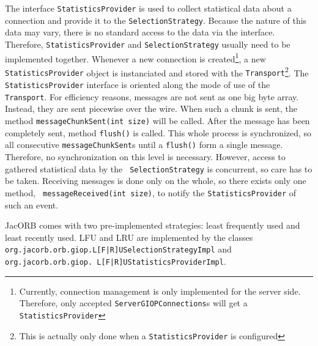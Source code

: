 The interface {\tt StatisticsProvider} is used to collect statistical data
about a connection and provide it to the {\tt SelectionStrategy}.  Because the
nature of this data may vary, there is no standard access to the data via the
interface. Therefore, {\tt StatisticsProvider} and {\tt SelectionStrategy}
usually need to be implemented together. Whenever a new connection is
created\footnote{Currently, connection management is only implemented for the
  server side. Therefore, only accepted {\tt ServerGIOPConnections}s will get
  a {\tt StatisticsProvider}}, a new {\tt StatisticsProvider} object is
instanciated and stored with the {\tt Transport}\footnote{This is actually
  only done when a {\tt StatisticsProvider} is configured}. The {\tt
  StatisticsProvider} interface is oriented along the mode of use of the {\tt
  Transport}. For efficiency reasons, messages are not sent as one big byte
array. Instead, they are sent piecewise over the wire. When such a chunk is
sent, the method {\tt messageChunkSent(int size)} will be called. After the
message has been completely sent, method {\tt flush()} is called. This whole
process is synchronized, so all consecutive {\tt messageChunkSent}s until a
{\tt flush()} form a single message. Therefore, no synchronization on this
level is necessary. However, access to gathered statistical data by the {\tt
  SelectionStrategy} is concurrent, so care has to be taken. Receiving
messages is done only on the whole, so there exists only one method, {\tt
  messageReceived(int size)}, to notify the {\tt StatisticsProvider} of such
an event.

JacORB comes with two pre-implemented strategies: least frequently used and
least recently used. LFU and LRU are implemented by the classes {\tt
  org.jacorb.orb.giop.L[F|R]USelectionStrategyImpl} and {\tt
  org.jacorb.orb.giop. L[F|R]U\-Statistics\-ProviderImpl}.

